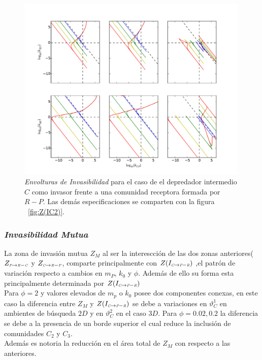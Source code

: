 \begin{figure}
  \centering
  \includegraphics[width = 0.99\textwidth]{./Plots/Z(IC5)AcGrGr.pdf}
  \caption[Env $Z(IC5)$]{\emph{Envolturas de Invasibilidad} para el caso de el depredador intermedio $C$ como invasor frente a una comunidad receptora formada por $R-P$. Las dem\'as especificaciones se comparten con la figura ~\ref{fig:Z(IC2)}.}
  \label{fig:Z(IC5)}
\end{figure}



\subsubsection{\emph{Invasibilidad Mutua}}

La zona de invasi\'on mutua $Z_M$ al ser la interescci\'on de las dos zonas anteriores($Z_{\textit{\tiny P} \to \textit{\tiny R}-\textit{\tiny C}}$ y $ Z_{\textit{\tiny C} \to \textit{\tiny R}-\textit{\tiny P}}$, comparte principalmente con $Z(I_{\textit{\tiny C} \to \textit{\tiny P}- \textit{\tiny R}})$ ,el patr\'on de variaci\'on respecto a cambios en $m_P$, $k_0$ y $\phi$. Adem\'as de ello su forma esta principalmente determinada por $Z(I_{\textit{\tiny C} \to \textit{\tiny P}- \textit{\tiny R}})$\\
Para $\phi = 2$ y valores elevados de $m_p$ o $k_0$ posee dos componentes conexas, en este caso la diferencia entre $Z_M$ y $Z(I_{\textit{\tiny C} \to \textit{\tiny P}- \textit{\tiny R}})$ se debe a variaciones en $\vartheta_C^1$ en ambientes de b\'usqueda $2D$ y en $\vartheta_C^2$ en el caso $3D$. Para $\phi = 0.02,0.2$ la diferencia se debe a la presencia de un borde superior el cual reduce la inclusi\'on de comunidades $C_2$ y $C_3$.\\
Adem\'as es notoria la reducci\'on en el \'area total de $Z_M$ con respecto a las anteriores.

